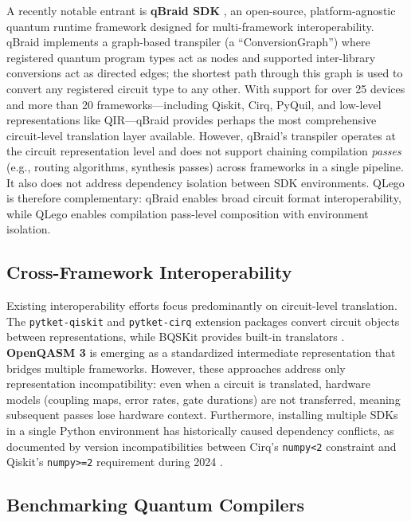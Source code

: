 \documentclass[conference]{IEEEtran}
\begin{document}
A recently notable entrant is \textbf{qBraid SDK} \cite{qbraid}, an open-source, platform-agnostic quantum runtime framework designed for multi-framework interoperability. qBraid implements a graph-based transpiler (a ``ConversionGraph'') where registered quantum program types act as nodes and supported inter-library conversions act as directed edges; the shortest path through this graph is used to convert any registered circuit type to any other. With support for over 25 devices and more than 20 frameworks—including Qiskit, Cirq, PyQuil, and low-level representations like QIR—qBraid provides perhaps the most comprehensive circuit-level translation layer available. However, qBraid's transpiler operates at the circuit representation level and does not support chaining compilation \textit{passes} (e.g., routing algorithms, synthesis passes) across frameworks in a single pipeline. It also does not address dependency isolation between SDK environments. QLego is therefore complementary: qBraid enables broad circuit format interoperability, while QLego enables compilation pass-level composition with environment isolation.

\subsection{Cross-Framework Interoperability}

Existing interoperability efforts focus predominantly on circuit-level translation. The \texttt{pytket-qiskit} and \texttt{pytket-cirq} extension packages \cite{sivarajah2020tket} convert circuit objects between representations, while BQSKit provides built-in translators \cite{patel2022bqskit}. \textbf{OpenQASM 3} \cite{cross2022openqasm3} is emerging as a standardized intermediate representation that bridges multiple frameworks. However, these approaches address only representation incompatibility: even when a circuit is translated, hardware models (coupling maps, error rates, gate durations) are not transferred, meaning subsequent passes lose hardware context. Furthermore, installing multiple SDKs in a single Python environment has historically caused dependency conflicts, as documented by version incompatibilities between Cirq's \texttt{numpy<2} constraint and Qiskit's \texttt{numpy>=2} requirement during 2024 \cite{benchpress}.

\subsection{Benchmarking Quantum Compilers}
\end{document}
